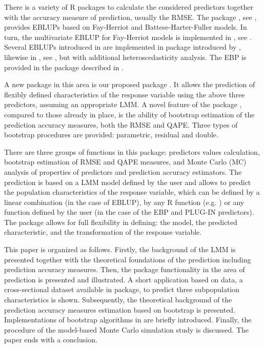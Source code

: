 There is a variety of R packages to calculate the considered predictors together with the accuracy measure of prediction, usually the RMSE. The package , see \cite{sae}, provides EBLUPs based on Fay-Herriot and Battese-Harter-Fuller models. In turn, the multivariate EBLUP for Fay-Herriot models is implemented in , see \cite{msae}. Several EBLUPs introduced in \cite{rao1994small} are implemented in package  introduced by \cite{saery}, likewise in , see \cite{josae}, but with additional heteroscedasticity analysis. The EBP is provided in the package  described in \cite{kreutzmann2019r}.

 A new package in this area is our proposed package .  It allows the prediction of flexibly defined characteristics of the response variable using the above three predictors, assuming an appropriate LMM. A novel feature of the package , compared to those already in place, is the ability of bootstrap estimation of the prediction accuracy measures, both the RMSE and QAPE.  Three types of bootstrap procedures are provided: parametric, residual and double.

There are three groups of functions in this package: predictors values calculation, bootstrap estimation of RMSE and QAPE measures, and Monte Carlo (MC) analysis of properties of predictors and prediction accuracy estimators. The prediction is based on a LMM model defined by the user and allows to predict the population characteristics of the response variable, which can be defined by a linear combination (in the case of EBLUP), by any R function (e.g. ) or any function defined by the user (in the case of the EBP and PLUG-IN predictors). The package allows for full flexibility in defining: the model, the predicted characteristic, and the transformation of the response variable.

This paper is organized as follows. Firstly, the background of the LMM is presented together with the theoretical foundations of the prediction including prediction accuracy measures. Then, the package functionality in the area of prediction is presented and illustrated. A short application based on  data, a cross-sectional dataset available in  package, to predict three subpopulation characteristics is shown. Subsequently, the theoretical background of the prediction accuracy measures estimation based on bootstrap is presented. Implementations of bootstrap algorithms in  are briefly introduced. Finally, the procedure of the model-based Monte Carlo simulation study is discussed. The paper ends with a conclusion.



